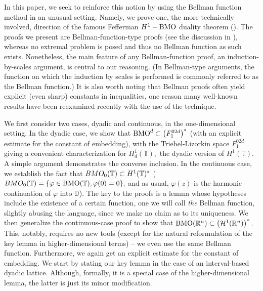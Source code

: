 \documentclass[psamsfonts]{conm-p-l}
\theoremstyle{definition}
\theoremstyle{remark}
\numberwithin{equation}{section}
\begin{document}
In this paper, we seek to reinforce this notion by using the Bellman function method in an unusual setting. Namely, we prove one, the more technically involved, direction of the famous Fefferman $H^1-{{\rm{BMO}}}$ duality theorem (\cite{fefferman}). The proofs we present are Bellman-function-type proofs (see the discussion in \cite{s}), whereas no extremal problem is posed and thus no Bellman function as such exists. Nonetheless, the main feature of any Bellman-function proof, an induction-by-scales argument, is central to our reasoning. (In Bellman-type arguments, the function on which the induction by scales is performed is commonly referred to as the Bellman function.) It is also worth noting that Bellman proofs often yield explicit (even sharp) constants in inequalities, one reason many well-known results have been reexamined recently with the use of the technique.    

We first consider two cases, dyadic and continuous, in the one-dimensional setting. In the dyadic case, we show that ${{\rm{BMO}}}^d\subset\left({F^{02d}_1}\right)^*$ (with an explicit estimate for the constant of embedding), with the Triebel-Lizorkin space ${F^{02d}_1}$ giving a convenient characterization for $H^1_d(\mathbb{T}),$ the dyadic version of $H^1(\mathbb{T}).$ A simple argument demonstrates the converse inclusion. In the continuous case, we establish the fact that ${\displaystyle} BMO_0(\mathbb{T})\subset H^1(\mathbb{T})^{*}$ (${\displaystyle} BMO_0(\mathbb{T})=\{\varphi\in {{\rm{BMO}}}(\mathbb{T}),\varphi(0)=0\},$ and as usual, $\varphi(z)$ is the harmonic continuation of $\varphi$ into $\mathbb{D}$). The key to the proofs is a lemma whose hypotheses include the existence of a certain function, one we will call {\it the} Bellman function, slightly abusing the language, since we make no claim as to its uniqueness. We then generalize the continuous-case proof to show that ${{\rm{BMO}}}(\mathbb{R}^n)\subset \left(\mathcal{H}^1(\mathbb{R}^n)\right)^*.$ This, notably, requires no new tools (except for the natural reformulation of the key lemma in higher-dimensional terms) -- we even use the same Bellman function. Furthermore, we again get an explicit estimate for the constant of embedding. We start by stating our key lemma in the case of an interval-based dyadic lattice. Although, formally, it is a special case of the higher-dimensional lemma, the latter is just its minor modification. 
\end{document}
